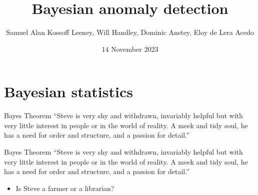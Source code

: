 \documentclass{beamer}
\title{Bayesian anomaly detection}
\date{14 November 2023}
\author{Samuel Alan Kossoff Leeney, Will Handley, Dominic Anstey, Eloy de Lera Acedo}
\institute{Breakthrough Listen Technosignature Workshop 2023}
\begin{document}
\begin{frame}
  \titlepage



\end{frame}


  \section{Bayesian statistics}
  \begin{frame}{Bayes Theorem}
    ``Steve is very shy and withdrawn, invariably helpful but with very little interest in people or in the world of reality. A meek and tidy soul, he has a need for order and structure, and a passion for detail.''
  \end{frame}

  \begin{frame}{Bayes Theorem}
    ``Steve is very shy and withdrawn, invariably helpful but with very little interest in people or in the world of reality. A meek and tidy soul, he has a need for order and structure, and a passion for detail.''

    \begin{itemize}
    \item Is Steve a farmer or a librarian?
    \end{itemize}

  \end{frame}
\end{document}
